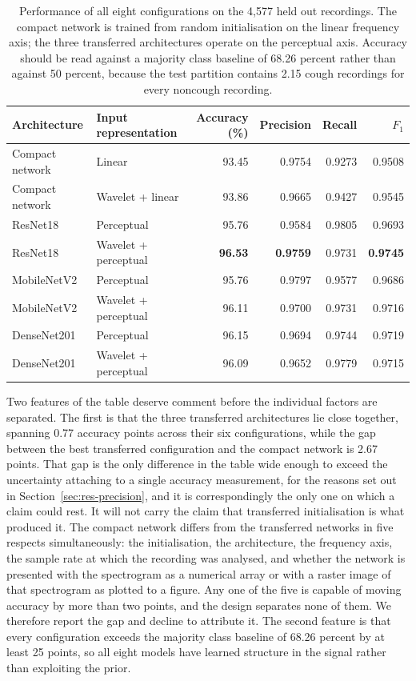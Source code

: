 \begin{table}[t]
\centering
\footnotesize
\caption{Performance of all eight configurations on the 4,577 held out
recordings. The compact network is trained from random initialisation on the
linear frequency axis; the three transferred architectures operate on the
perceptual axis. Accuracy should be read against a majority class baseline of
68.26 percent rather than against 50 percent, because the test partition
contains 2.15 cough recordings for every noncough recording.}
\label{tab:main}
\begin{tabular}{@{}llrrrr@{}}
\toprule
Architecture & Input representation & Accuracy (\%) & Precision & Recall & $F_1$ \\
\midrule
Compact network & Linear & 93.45 & 0.9754 & 0.9273 & 0.9508 \\
Compact network & Wavelet + linear & 93.86 & 0.9665 & 0.9427 & 0.9545 \\
ResNet18 & Perceptual & 95.76 & 0.9584 & 0.9805 & 0.9693 \\
ResNet18 & Wavelet + perceptual & \textbf{96.53} & \textbf{0.9759} & 0.9731 & \textbf{0.9745} \\
MobileNetV2 & Perceptual & 95.76 & 0.9797 & 0.9577 & 0.9686 \\
MobileNetV2 & Wavelet + perceptual & 96.11 & 0.9700 & 0.9731 & 0.9716 \\
DenseNet201 & Perceptual & 96.15 & 0.9694 & 0.9744 & 0.9719 \\
DenseNet201 & Wavelet + perceptual & 96.09 & 0.9652 & 0.9779 & 0.9715 \\
\bottomrule
\end{tabular}
\end{table}

Two features of the table deserve comment before the individual factors are
separated. The first is that the three transferred architectures lie close
together, spanning 0.77 accuracy points across their six configurations, while
the gap between the best transferred configuration and the compact network is
2.67 points. That gap is the only difference in the table wide enough to
exceed the uncertainty attaching to a single accuracy measurement, for the
reasons set out in Section~\ref{sec:res-precision}, and it is correspondingly
the only one on which a claim could rest. It will not carry the claim that
transferred initialisation is what produced it. The compact network differs
from the transferred networks in five respects simultaneously: the
initialisation, the architecture, the frequency axis, the sample rate at which
the recording was analysed, and whether the network is presented with the
spectrogram as a numerical array or with a raster image of that spectrogram as
plotted to a figure. Any one of the five is capable of moving accuracy by more
than two points, and the design separates none of them. We therefore report
the gap and decline to attribute it. The second feature is that every
configuration exceeds the majority class baseline of 68.26 percent by at least
25 points, so all eight models have learned structure in the signal rather
than exploiting the prior.

